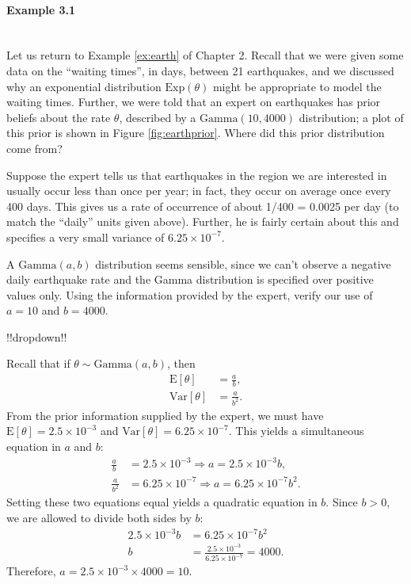 \paragraph{Example 3.1}{~\\
\label{ex:earthret}
\noindent Let us return to Example \ref{ex:earth} of Chapter 2.  Recall that we were given some data on the ``waiting times'', in days, between 21 earthquakes, and we discussed why an exponential distribution $\mathrm{Exp}(\theta)$ might be appropriate to model the waiting times.  Further, we were told that an expert on earthquakes has prior beliefs about the rate $\theta$, described by a $\mathrm{Gamma}(10,4000)$ distribution; a plot of this prior is shown in Figure \ref{fig:earthprior}.  Where did this prior distribution come from?

Suppose the expert tells us that earthquakes in the region we are interested in usually occur less than once per year; in fact, they occur on average once every 400 days.  This gives us a rate of occurrence of about 1/400 = 0.0025 per day (to match the ``daily'' units given above).  Further, he is fairly certain about this and specifies a very small variance of $6.25 \times 10^{-7}$.  

A $\mathrm{Gamma}(a,b)$ distribution seems sensible, since we can't observe a negative daily earthquake rate and the Gamma distribution is specified over positive values only.  Using the information provided by the expert, verify our use of $a=10$ and $b=4000$.}

!!dropdown!!

Recall that if $\theta \sim \mathrm{Gamma}(a,b)$, then
    \begin{align*}
        \text{E}[\theta] &= \frac{a}{b}, \\
        \text{Var}[\theta] &= \frac{a}{b^2}.
    \end{align*}
    From the prior information supplied by the expert, we must have $\text{E}[\theta] = 2.5\times 10^{-3}$ and $\text{Var}[\theta] = 6.25\times 10^{-7}$. This yields a simultaneous equation in $a$ and $b$:
    \begin{align*}
        \frac{a}{b} &= 2.5\times 10^{-3} \Rightarrow a = 2.5\times 10^{-3} b, \\
        \frac{a}{b^2} &= 6.25\times 10^{-7} \Rightarrow a = 6.25\times 10^{-7}b^2.
    \end{align*}
    Setting these two equations equal yields a quadratic equation in $b$. Since $b > 0$, we are allowed to divide both sides by $b$:
    \begin{align*}
        2.5\times 10^{-3} b &= 6.25\times 10^{-7}b^2 \\
        b &= \frac{2.5\times 10^{-3}}{ 6.25\times 10^{-7}} = 4000.
    \end{align*}
    Therefore, $a = 2.5\times 10^{-3} \times 4000 = 10$.

